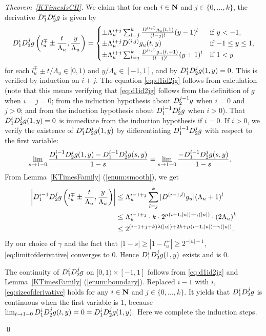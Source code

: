 \begin{proof}[Theorem~\ref{KTimesIsCH}]
We claim that 
for each $i \in \mathbf N$ and $j \in \{0, \dots, k\}$, 
the derivative $D _1 ^i D _2 ^j g$ is given by 
\begin{equation}
   D_1^i D_2^j g \left(l^\mp_u \pm \frac{t}{\Lambda_u}, \frac{y}{\Lambda_u}\right)
   = \begin{cases}
      \pm \Lambda_u^{i+j} \sum^{k}_{l=j} \frac{D^{(i,l)} g_u(t,1)}{(l-j)!}
      (y - 1)^l &  \text{if } y < -1,
      \\
      \pm \Lambda_u^{i+j} D^{(i, j)} g_u(t, y) & \text{if } {-1} \le y \le 1,
      \\
      \pm \Lambda_u^{i+j} \sum^{k}_{l=j} 
      \frac{D^{(i,l)} g_u(t, -1)}{(l-j)!} (y + 1)^l &  \text{if } 1<y
    \end{cases}  \label{eq:d1id2jg}
\end{equation}
for each $l_u^\mp \pm t/\Lambda_u \in [0,1)$ and $y/\Lambda_u \in [-1, 1]$, 
and by $D _1 ^i D _2 ^j g (1, y) = 0$. 
This is verified by induction on $i + j$. 
The equation \eqref{eq:d1id2jg} follows from calculation 
(note that this means verifying 
that \eqref{eq:d1id2jg} follows from the definition of $g$ when $i = j = 0$; 
from the induction hypothesis about $D _2 ^{j - 1} g$ when $i = 0$ and $j > 0$; 
and from the induction hypothesis about $D _1 ^{i - 1} D _2 ^j g$ when $i > 0$).
That $D _1 ^i D _2 ^j g (1, y) = 0$ is 
immediate from the induction hypothesis if $i = 0$. 
If $i > 0$, we verify the existence of $D_1^i D_2^j g(1, y)$
by differentiating $D_1^{i-1} D_2^j g$ with respect to the first variable:
\begin{align}
\lim_{s \to 1-0} \frac{D_1^{i-1} D_2^j g(1, y) - D_1^{i-1} D_2^j g (s, y)}{1 - s}
&= \lim_{s \to 1-0} \frac{- D_1^{i-1} D_2^j g (s, y)}{1 - s}. \label{eq:limitofderivative}
\end{align}
From Lemma~\ref{KTimesFamily} (\ref{enum:smooth}), we get
 \begin{align}
  \left|D_1^{i-1} D_2^j g \left(l^\mp_u \pm \frac{t}{\Lambda_u},
  \frac{y}{\Lambda_u}\right)\right|
  &\le 
  \Lambda_u^{i-1+j} \sum^{k}_{l=j} |D^{(i-1,l)} g_u | (\Lambda_u + 1)^l 
  \notag
  \\
  &\le
  \Lambda_u^{i-1+j}  \cdot k \cdot 2^{\mu(i-1, |u|) - \gamma(|u|)} \cdot (2\Lambda_u)^k
  \notag
  \\
  & 
  \le  2^{(i-1+j+k)\lambda(|u|) + 2k + \mu(i-1, |u|)  - \gamma(|u|)}.
  \label{eq:sizeofderivative}
 \end{align}
By our choice of $\gamma$ and the fact that $|1-s| \ge |1-l_u^+| \ge 2^{-|u|-1}$,
\eqref{eq:limitofderivative} converges to $0$.
Hence $D_1^i D_2^j g(1, y)$ exists and is $0$.

The continuity of $D _1 ^i D _2 ^j g$ on $[0,1) \times [-1, 1]$ follows
from \eqref{eq:d1id2jg} and Lemma~\ref{KTimesFamily} (\ref{enum:boundary}).
Replaced $i-1$ with $i$, \eqref{eq:sizeofderivative} holds for any $i \in \mathbf N$ and $j \in \{0, \dots, k\}$.
It yields that  $D_1^{i} D_2^{j} g$ is continuous when the first variable is $1$, because
$
 \lim_{t \to 1-0} D_1^i D_2^j g(t,y) = 0 = D_1^i D_2^j g(1, y).
$
Here we complete the induction steps.

\qed
\end{proof} 

